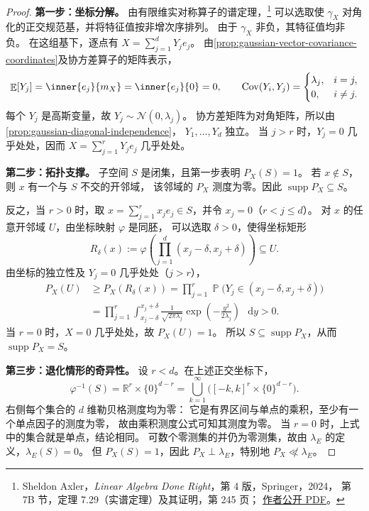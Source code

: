 \documentclass[UTF8,11pt,a4paper,oneside,fontset=fandol]{ctexrep}
\numberwithin{equation}{section}
\theoremstyle{plain}
\theoremstyle{definition}
\theoremstyle{remark}
\newcommand{\R}{\mathbb{R}}
\DeclareMathOperator{\Prob}{\mathbb{P}}
\DeclareMathOperator{\E}{\mathbb{E}}
\DeclareMathOperator{\Cov}{Cov}
\newcommand{\dd}{\mathop{}\!\mathrm{d}}
\begin{document}
\begin{proof}
\textbf{第一步：坐标分解。}
由有限维实对称算子的谱定理，\footnote{%
\label{fn:real-spectral-theorem-support}%
Sheldon Axler，\emph{Linear Algebra Done Right}，第 4 版，Springer，2024，
第 7B 节，定理 7.29（实谱定理）及其证明，第 245 页；
\href{https://linear.axler.net/LADR4e.pdf}{作者公开 PDF}。}
可以选取使 $\gamma_X$ 对角化的正交规范基，并将特征值按非增次序排列。
由于 $\gamma_X$ 非负，其特征值均非负。
在这组基下，逐点有 $X=\sum_{j=1}^{d}Y_je_j$。
由\cref{prop:gaussian-vector-covariance-coordinates}及协方差算子的矩阵表示，
\[
  \E[Y_j]=\inner{e_j}{m_X}=\inner{e_j}{0}=0,
  \qquad
  \Cov(Y_i,Y_j)
  =\begin{cases}
     \lambda_j,&i=j,\\
     0,&i\ne j.
   \end{cases}
\]
每个 $Y_j$ 是高斯变量，故 $Y_j\sim\mathcal{N}(0,\lambda_j)$。
协方差矩阵为对角矩阵，所以由\cref{prop:gaussian-diagonal-independence}，
$Y_1,\ldots,Y_d$ 独立。
当 $j>r$ 时，$Y_j=0$ 几乎处处，因而
$X=\sum_{j=1}^{r}Y_je_j$ 几乎处处。

\textbf{第二步：拓扑支撑。}
子空间 $S$ 是闭集，且第一步表明 $P_X(S)=1$。
若 $x\notin S$，则 $x$ 有一个与 $S$ 不交的开邻域，
该邻域的 $P_X$ 测度为零。因此 $\operatorname{supp}P_X\subseteq S$。

反之，当 $r>0$ 时，取 $x=\sum_{j=1}^{r}x_je_j\in S$，并令 $x_j=0$（$r<j\le d$）。
对 $x$ 的任意开邻域 $U$，由坐标映射 $\varphi$ 是同胚，
可以选取 $\delta>0$，使得坐标矩形
\[
  R_\delta(x)
  :=\varphi\!\left(\prod_{j=1}^{d}(x_j-\delta,x_j+\delta)\right)
  \subseteq U.
\]
由坐标的独立性及 $Y_j=0$ 几乎处处（$j>r$），
\begin{align*}
  P_X(U)
  &\ge P_X(R_\delta(x))
    =\prod_{j=1}^{r}\Prob\bigl(Y_j\in(x_j-\delta,x_j+\delta)\bigr)\\
  &=\prod_{j=1}^{r}
      \int_{x_j-\delta}^{x_j+\delta}
        \frac{1}{\sqrt{2\pi\lambda_j}}
        \exp\!\left(-\frac{y^2}{2\lambda_j}\right)\,\dd y
    >0.
\end{align*}
当 $r=0$ 时，$X=0$ 几乎处处，故 $P_X(U)=1$。
所以 $S\subseteq\operatorname{supp}P_X$，从而 $\operatorname{supp}P_X=S$。

\textbf{第三步：退化情形的奇异性。}
设 $r<d$。在上述正交坐标下，
\[
  \varphi^{-1}(S)=\R^r\times\{0\}^{d-r}
  =\bigcup_{k=1}^{\infty}
      \bigl([-k,k]^r\times\{0\}^{d-r}\bigr).
\]
右侧每个集合的 $d$ 维勒贝格测度均为零：
它是有界区间与单点的乘积，至少有一个单点因子的测度为零，
故由乘积测度公式可知其测度为零。
当 $r=0$ 时，上式中的集合就是单点，结论相同。
可数个零测集的并仍为零测集，故由 $\lambda_E$ 的定义，$\lambda_E(S)=0$。
但 $P_X(S)=1$，因此 $P_X\perp\lambda_E$，特别地 $P_X\not\ll\lambda_E$。


\end{proof}
\end{document}
